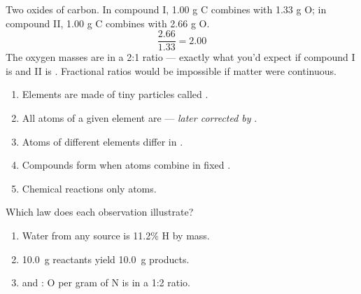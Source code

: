 \documentclass{apchem-notes}
\begin{document}
\begin{workedexample}
Two oxides of carbon. In compound I, 1.00 g C combines with 1.33 g O; in
compound II, 1.00 g C combines with 2.66 g O.
\[
  \frac{2.66}{1.33} = 2.00
\]
The oxygen masses are in a 2:1 ratio --- exactly what you'd expect if
compound I is  and II is . Fractional ratios would be
impossible if matter were continuous.
\end{workedexample}


\begin{enumerate}[leftmargin=*,itemsep=0.15em]
  \item Elements are made of tiny particles called .
  \item All atoms of a given element are 
        --- \emph{later corrected by} .
  \item Atoms of different elements differ in
        .
  \item Compounds form when atoms combine in fixed
        .
  \item Chemical reactions only  atoms.
\end{enumerate}


Which law does each observation illustrate?
\begin{enumerate}[leftmargin=*,itemsep=0.35em]
  \item Water from any source is 11.2\% H by mass.
  \item \SI{10.0}{\gram} reactants yield \SI{10.0}{\gram} products.
  \item {} and : O per gram of N is in a 1:2 ratio.
\end{enumerate}


\end{document}
